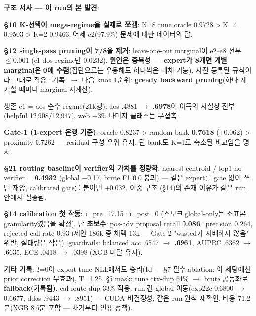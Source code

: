 \textbf{구조 서사 — 이 run의 본 발견}:

\par\noindent \textbullet\enspace \textbf{§10 K-선택이 mega-regime을 실제로 쪼갬}: K=\allowbreak{}8 tune oracle 0.9728 > K=\allowbreak{}4 0.9503 > K=\allowbreak{}2 0.9463. 어제 c2(97.9\%) 문제에 대한 데이터의 답.


\par\noindent \textbullet\enspace \textbf{§12 single-pass pruning이 7/\allowbreak{}8을 제거}: leave-one-out marginal이 e2–e8 전부 \ensuremath{\leq}0.001 (e1 dos-regime만 0.0232). \textbf{원인은 중복성 — expert가 8개면 개별 marginal은 0에 수렴}(집단으로는 유용해도 하나씩은 대체 가능). 사전 등록된 규칙이라 그대로 적용·기록.  \ensuremath{\rightarrow}  다음 knob 1순위: \textbf{greedy backward pruning}(하나 제거할 때마다 marginal 재계산).


\par\noindent \textbullet\enspace 생존 e1 =\allowbreak{} dos 순수 regime(21k행): dos .4881 \ensuremath{\rightarrow} \textbf{.6978}이 이득의 사실상 전부(helpful 12,908/\allowbreak{}12,947), web +\allowbreak{}39. 나머지 클래스는 무접촉.


\textbf{Gate-1 (1-expert 은행 기준)}: oracle 0.8237 > random bank \textbf{0.7618} (+\allowbreak{}0.062) > proximity 0.7262 — residual 구성 우위 유지. 단 bank도 K=\allowbreak{}1로 축소된 비교임을 명시.

\textbf{§21 routing baseline이 verifier의 가치를 정량화}: nearest-centroid /\allowbreak{} top1-no-verifier =\allowbreak{} \textbf{0.4932} (global −0.17, brute F1 0.0 붕괴) — 같은 expert를 gate 없이 쓰면 재앙, calibrated gate를 붙이면 +\allowbreak{}0.032. 이중 구조 (§14)의 존재 이유가 같은 run 안에서 실증됨.

\textbf{§14 calibration 첫 작동}: τ\_\allowbreak{}pre=\allowbreak{}17.15·τ\_\allowbreak{}post=\allowbreak{}0 (스모크 global-only는 소표본 granularity였음을 확정). 단 \textbf{초보수}: pos-adv proposal recall \textbf{0.086}·precision 0.264, rejected-call rate 0.93 (제안 186k 중 채택 13k — Gate-2 "wasted가 지배하지 않음" 위반, 절대량은 작음). guardrails: balanced acc .6547 \ensuremath{\rightarrow} \textbf{.6961}, AUPRC .6362 \ensuremath{\rightarrow} .6635, ECE .0418 \ensuremath{\rightarrow} .0398 (XGB 미달 유지).

\textbf{기타 기록}: β=\allowbreak{}0이 expert tune NLL에서도 승리(1d — §7 필수 ablation: 이 세팅에선 prior correction 무효과), T=\allowbreak{}1.25. §5 mask: tune ctx-dup 61\%  \ensuremath{\rightarrow}  brute 공동화로 \textbf{fallback(기록됨)}, cal route-dup 33\% 적용. run 간 global 이동(exp22c 0.6800 \ensuremath{\rightarrow} 0.6677, ddos .9443 \ensuremath{\rightarrow} .8951) — CUDA 비결정성, 같은-run 원칙 재확인. 비용 71.2분(XGB 8.6분 포함 — 차기부터 인용 정책).

